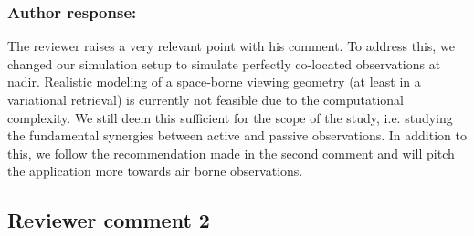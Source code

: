 \documentclass[11pt]{scrartcl}
\begin{document}
\subsubsection*{Author response:}

The reviewer raises a very relevant point with his comment. To address this, we
changed our simulation setup to simulate perfectly co-located observations at
nadir. Realistic modeling of a space-borne viewing geometry (at least in a
variational retrieval) is currently not feasible due to the computational
complexity. We still deem this sufficient for the scope of the study,
i.e. studying the fundamental synergies between active and passive observations.
In addition to this, we follow the recommendation made in the second comment and
will pitch the application more towards air borne observations.

%

\subsection*{Reviewer comment 2}
\end{document}

